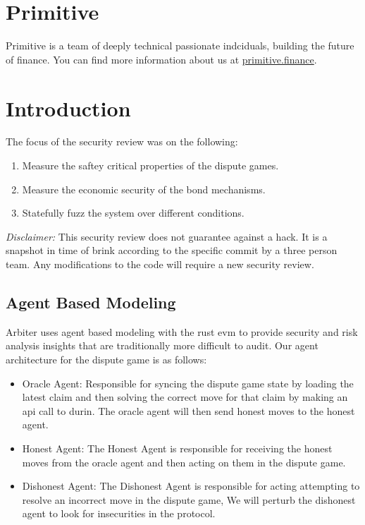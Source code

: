 \section{Primitive}\label{primitive}

Primitive is a team of deeply technical passionate indciduals, building
the future of finance.
You can find more information about us at \href{https://primitive.finance}{primitive.finance}.

\section{Introduction}\label{introduction}

The focus of the security review was on the following:

\begin{enumerate}
\def\labelenumi{\arabic{enumi}.}
\tightlist
\item
  Measure the saftey critical properties of the dispute games.
\item
  Measure the economic security of the bond mechanisms.
\item
  Statefully fuzz the system over different conditions.
\end{enumerate}

\emph{Disclaimer:} This security review does not guarantee against a
hack. It is a snapshot in time of brink according to the specific commit
by a three person team. Any modifications to the code will require a new
security review.

\subsection{Agent Based Modeling}\label{agent-based-modeling}

Arbiter uses agent based modeling with the rust evm to provide security
and risk analysis insights that are traditionally more difficult to
audit. Our agent architecture for the dispute game is as follows:

\begin{itemize}
\tightlist
\item
  Oracle Agent: Responsible for syncing the dispute game state by
  loading the latest claim and then solving the correct move for that
  claim by making an api call to durin. The oracle agent will then send
  honest moves to the honest agent.
\item
  Honest Agent: The Honest Agent is responsible for receiving the honest
  moves from the oracle agent and then acting on them in the dispute
  game.
\item
  Dishonest Agent: The Dishonest Agent is responsible for acting
  attempting to resolve an incorrect move in the dispute game, We will
  perturb the dishonest agent to look for insecurities in the protocol.
\end{itemize}

